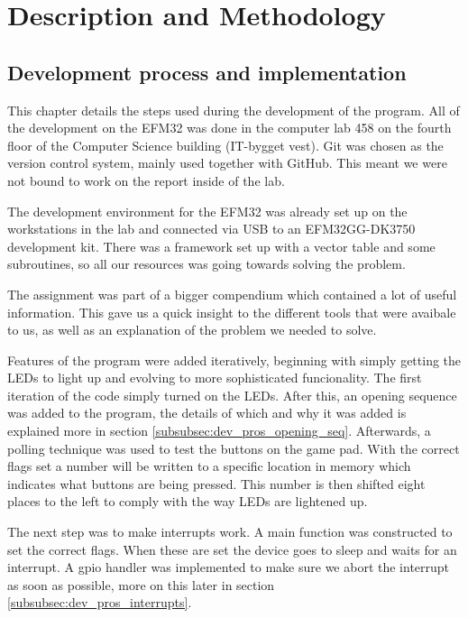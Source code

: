 \section{Description and Methodology}
\label{chap:description}

\subsection{Development process and implementation}
\label{subsec:development_process}

This chapter details the steps used during the development of the program. All of the development on the EFM32 was done in the computer lab 458 on the fourth floor of the Computer Science building (IT-bygget vest). Git was chosen as the version control system, mainly used together with GitHub. This meant we were not bound to work on the report inside of the lab.

The development environment for the EFM32 was already set up on the workstations in the lab and connected via USB to an EFM32GG-DK3750 development kit. There was a framework set up with a vector table and some subroutines, so all our resources was going towards solving the problem.

The assignment was part of a bigger compendium which contained a lot of useful information. This gave us a quick insight to the different tools that were avaibale to us, as well as an explanation of the problem we needed to solve.

Features of the program were added iteratively, beginning with simply getting the LEDs to light up and evolving to more sophisticated funcionality. The first iteration of the code simply turned on the LEDs. After this, an opening sequence was added to the program, the details of which and why it was added is explained more in section \ref{subsubsec:dev_pros_opening_seq}. Afterwards, a polling technique was used to test the buttons on the game pad. With the correct flags set a number will be written to a specific location in memory which indicates what buttons are being pressed. This number is then shifted eight places to the left to comply with the way LEDs are lightened up.

The next step was to make interrupts work. A main function was constructed to set the correct flags. When these are set the device goes to sleep and waits for an interrupt. A gpio handler was implemented to make sure we abort the interrupt as soon as possible, more on this later in section \ref{subsubsec:dev_pros_interrupts}.

